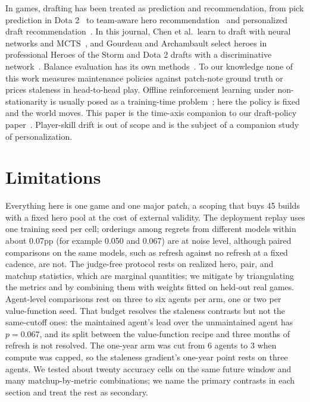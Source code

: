 \documentclass[journal]{IEEEtran}
\begin{document}
In games, drafting has been treated as prediction and recommendation,
from pick prediction in Dota 2~\cite{summerville2016draft} to team-aware
hero recommendation~\cite{chen2018art} and personalized draft
recommendation~\cite{draftrec}. In this journal, Chen et al.\ learn to
draft with neural networks and MCTS~\cite{chen2021juewudraft}, and
Gourdeau and Archambault select heroes in professional Heroes of the
Storm and Dota 2 drafts with a discriminative network~\cite{gourdeau2021discriminative}.
Balance evaluation has its own methods~\cite{jaffe2012balance}. To our
knowledge none of this work measures maintenance policies against
patch-note ground truth or prices staleness in head-to-head play.
Offline reinforcement learning under non-stationarity is usually posed
as a training-time problem~\cite{levine2020offline}; here the policy is
fixed and the world moves. This paper is the time-axis companion to our
draft-policy paper~\cite{paper1}. Player-skill drift is out of scope and
is the subject of a companion study of personalization.

\section{Limitations}
\label{sec:limits}

Everything here is one game and one major patch, a scoping that buys 45
builds with a fixed hero pool at the cost of external validity. The
deployment replay uses one training seed per cell; orderings among
regrets from different models within about 0.07pp (for example 0.050
and 0.067) are at noise level, although paired comparisons on the same
models, such as refresh against no refresh at a fixed cadence, are
not. The judge-free protocol
rests on realized hero, pair, and matchup statistics, which are
marginal quantities; we mitigate by triangulating the metrics and by
combining them with weights fitted on held-out real games.
Agent-level comparisons rest on three to six agents per arm, one or two
per value-function seed. That budget resolves the staleness contrasts
but not the same-cutoff ones: the maintained agent's lead over the
unmaintained agent has $p = 0.067$, and its split between the
value-function recipe and three months of refresh is not resolved. The
one-year arm was cut from 6 agents to 3 when compute was capped, so the
staleness gradient's one-year point rests on three agents. We tested about
twenty accuracy cells on the same future window and many
matchup-by-metric combinations; we name the primary contrasts in each
section and treat the rest as secondary. 
\end{document}
